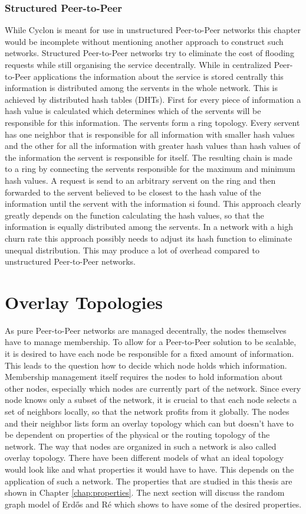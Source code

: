 \subsubsection{Structured Peer-to-Peer}
While Cyclon is meant for use in unstructured Peer-to-Peer networks this chapter
would be incomplete without mentioning another approach to construct such
networks. Structured Peer-to-Peer networks try to eliminate the cost of
flooding requests while still organising the service decentrally. While in
centralized Peer-to-Peer applications the information about the service is
stored centrally this information is distributed among the servents in the whole
network. This is achieved by distributed hash tables (DHTs). First for every
piece of information a hash value is calculated which determines which of the
servents will be responsible for this information. The servents form a ring
topology. Every servent has one neighbor that is responsible for all
information with smaller hash values and the other for all the information with greater hash
values than hash values of the information the servent is responsible for
itself. The resulting chain is made to a ring by connecting the servents
responsible for the maximum and minimum hash values. A request is send to an
arbitrary servent on the ring and then forwarded to the servent believed to be
closest to the hash value of the information until the servent with the
information si found. This approach clearly greatly depends on the function
calculating the hash values, so that the information is equally distributed
among the servents. In a network with a high churn rate this approach possibly
needs to adjust its hash function to eliminate unequal distribution. This may
produce a lot of overhead compared to unstructured Peer-to-Peer networks.


\section{Overlay Topologies}
As pure Peer-to-Peer networks are managed decentrally,
the nodes themselves have to manage membership. To allow for a Peer-to-Peer
solution to be scalable, it is desired to have each node be responsible for a
fixed amount of information. This leads to the question how to decide which node
holds which information. Membership management itself requires the nodes to hold
information about other nodes, especially which nodes are currently part of the
network. Since every node knows only a subset of the network, it is crucial to
that each node selects a set of neighbors locally, so that the network profits
from it globally. The nodes and their neighbor lists form an overlay topology
which can but doesn't have to be dependent on properties of the physical or
the routing topology of the network. The way that nodes are organized in such a
network is also called overlay topology. There have been different models of
what an ideal topology would look like and what properties it would have to
have. This depends on the application of such a network. The properties that are
studied in this thesis are shown in Chapter \ref{chap:properties}. The next
section will discuss the random graph model of Erd\H{o}s and R\'{e} which shows
to have some of the desired properties.
